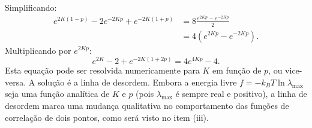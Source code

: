 \documentclass[11pt,a4paper]{article}
\begin{document}
%
Simplificando:
%
\begin{align}
    e^{2K(1-p)} - 2e^{-2Kp} + e^{-2K(1+p)} &= 8 \frac{e^{2Kp} - e^{-2Kp}}{2} \\
    &= 4\left( e^{2Kp} - e^{-2Kp} \right).
\end{align}
%
Multiplicando por \(e^{2Kp}\):
%
\begin{equation}
    e^{2K} - 2 + e^{-2K(1+2p)} = 4 e^{4Kp} - 4.
\end{equation}
%
Esta equação pode ser resolvida numericamente para \(K\) em função de \(p\), ou vice-versa. A solução é a linha de desordem.
%
Embora a energia livre \(f = -k_B T \ln \lambda_{\max}\) seja uma função analítica de \(K\) e \(p\) (pois \(\lambda_{\max}\) é sempre real e positivo), a linha de desordem marca uma mudança qualitativa no comportamento das funções de correlação de dois pontos, como será visto no item (iii).
%
\end{document}

